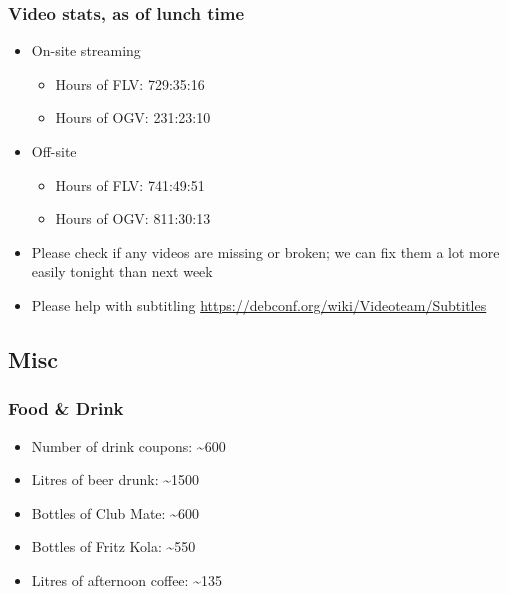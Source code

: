 \documentclass[t]{beamer}
\begin{document}
\begin{frame}
	\frametitle{Video stats, as of lunch time}
	\begin{itemize}
		\item On-site streaming
		\begin{itemize}
			\item Hours of FLV: 729:35:16
			\item Hours of OGV: 231:23:10
		\end{itemize}
		\item Off-site
		\begin{itemize}
			\item Hours of FLV: 741:49:51
			\item Hours of OGV: 811:30:13
		\end{itemize}
	\item Please check if any videos are missing or broken; we can fix them a lot more easily tonight than next week
	\item Please help with subtitling \url{https://debconf.org/wiki/Videoteam/Subtitles}
	\end{itemize}
\end{frame}


\subsection{Misc}

\begin{frame}
	\frametitle{Food \& Drink}
	\begin{itemize}
		\item Number of drink coupons: \~{}600
		\item Litres of beer drunk: \~{}1500
		\item Bottles of Club Mate: \~{}600
		\item Bottles of Fritz Kola: \~{}550
		\item Litres of afternoon coffee: \~{}135
	\end{itemize}
\end{frame}
\end{document}
